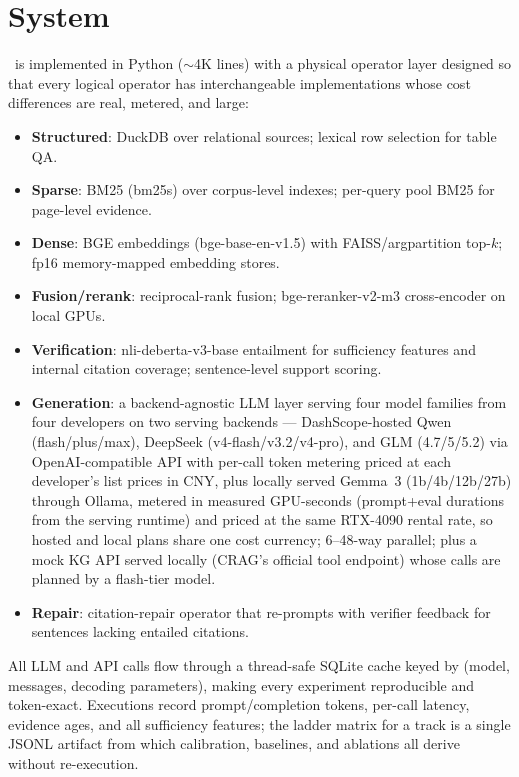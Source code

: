 \section{System}
\label{sec:system}

\system\ is implemented in Python ($\sim$4K lines) with a physical operator
layer designed so that every logical operator has interchangeable
implementations whose cost differences are real, metered, and large:

\begin{itemize}
\item \textbf{Structured}: DuckDB over relational sources; lexical row
selection for table QA.
\item \textbf{Sparse}: BM25 (bm25s) over corpus-level indexes; per-query
pool BM25 for page-level evidence.
\item \textbf{Dense}: BGE embeddings (bge-base-en-v1.5) with
FAISS\slash argpartition top-$k$; fp16 memory-mapped embedding stores.
\item \textbf{Fusion/rerank}: reciprocal-rank fusion; bge-reranker-v2-m3
cross-encoder on local GPUs.
\item \textbf{Verification}: nli-deberta-v3-base entailment for sufficiency
features and internal citation coverage; sentence-level support scoring.
\item \textbf{Generation}: a backend-agnostic LLM layer serving four
model families from four developers on two serving backends ---
DashScope-hosted Qwen (flash/plus/max), DeepSeek
(v4-flash/v3.2/v4-pro), and GLM (4.7/5/5.2)
via OpenAI-compatible API with per-call token metering priced at each
developer's list prices in CNY,
plus locally served Gemma~3 (1b/4b/12b/27b) through Ollama, metered in
measured GPU-seconds (prompt+eval durations from the serving runtime)
and priced at the same RTX-4090 rental rate, so hosted and local plans
share one cost currency; 6--48-way parallel; plus a mock KG API served
locally (CRAG's official tool endpoint) whose calls are planned by a
flash-tier model.
\item \textbf{Repair}: citation-repair operator that re-prompts with
verifier feedback for sentences lacking entailed citations.
\end{itemize}

All LLM and API calls flow through a thread-safe SQLite cache keyed by
(model, messages, decoding parameters), making every experiment
reproducible and token-exact. Executions record prompt/completion tokens,
per-call latency, evidence ages, and all sufficiency features; the ladder
matrix for a track is a single JSONL artifact from which calibration,
baselines, and ablations all derive without re-execution.

